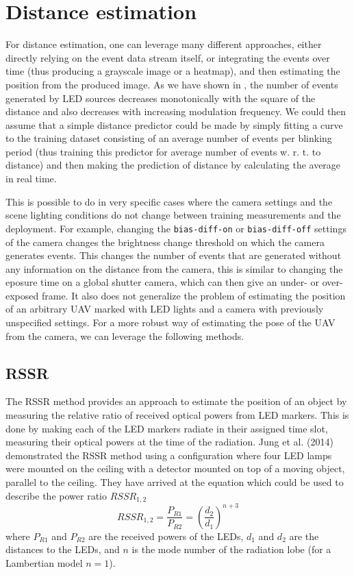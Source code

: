 
\chapter{Distance estimation\label{chap:p3p}}

For distance estimation, one can leverage many different approaches, either directly relying on the event data stream itself, or integrating the
events over time (thus producing a grayscale image or a heatmap), and then estimating the position from the produced image. As we have shown in , the number of events
generated by LED sources decreases monotonically with the square of the distance and also decreases with increasing modulation frequency.
We could then assume that a simple distance predictor could be made by simply fitting a curve to the training dataset consisting of an average
number of events per blinking period (thus training this predictor for average number of events w. r. t. to distance) and then making the prediction of distance by calculating the average in real time.

This is possible to do in very specific cases where the camera settings and the scene lighting conditions do not change between training measurements
and the deployment. For example, changing the \texttt{bias-diff-on} or \texttt{bias-diff-off} settings of the camera changes the brightness change threshold on
which the camera generates events.
This changes the number of events that are generated without any information on the distance from the camera, this is similar to changing the eposure
time on a global shutter camera, which can then give an under- or over-exposed frame.
It also does not generalize the problem of estimating the position of an arbitrary UAV marked with LED lights and a camera with previously unspecified
settings. For a more robust way of estimating the pose of the UAV from the camera, we can leverage the following methods.

\section{RSSR}

The \ac{RSSR} method provides an approach to estimate the position of an object by measuring the relative ratio of received optical powers from \ac{LED}
markers. This is done by making each of the \ac{LED} markers radiate in their assigned time slot, measuring their optical powers at the time of the
radiation. Jung et al. (2014) \cite{sooyongrssr} demonstrated the \ac{RSSR} method using a configuration where four LED lamps were mounted on the ceiling
with a detector mounted on top of a moving object, parallel to the ceiling.
They have arrived at the equation  which could be used to describe the power ratio $RSSR_{1,2}$
\begin{equation}
RSSR_{1,2} = \frac{P_{R1}}{P_{R2}} = \left( \frac{d_2}{d_1} \right)^{n+3}
\label{eq:rssr}
\end{equation}
where $P_{R1}$ and $P_{R2}$ are the received powers of the \ac{LED}s, $d_1$ and $d_2$ are the distances to the \ac{LED}s, and $n$ is the mode number of the radiation lobe (for a Lambertian model $n = 1$).

